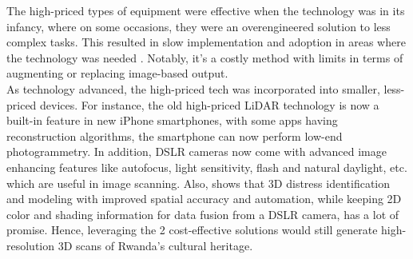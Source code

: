 \documentclass[conference]{IEEEtran}
\begin{document}

The high-priced types of equipment were effective when the technology was in its infancy, where on some occasions, they were an overengineered solution to less complex tasks. This resulted in slow implementation and adoption in areas where the technology was needed \cite{ptn}. Notably, it’s a costly method with limits in terms of augmenting or replacing image-based output. \\


As technology advanced, the high-priced tech was incorporated into smaller, less-priced devices. For instance, the old high-priced LiDAR technology is now a built-in feature in new iPhone smartphones, with some apps having reconstruction algorithms, the smartphone can now perform low-end photogrammetry. In addition, DSLR cameras now come with advanced image enhancing features like autofocus, light sensitivity, flash and natural daylight, etc. which are useful in image scanning. Also, \cite{ptn} shows that 3D distress identification and modeling with improved spatial accuracy and automation, while keeping 2D color and shading information for data fusion from a DSLR camera, has a lot of promise. Hence, leveraging the 2 cost-effective solutions would still generate high-resolution 3D scans of Rwanda’s cultural heritage. \\
\end{document}

